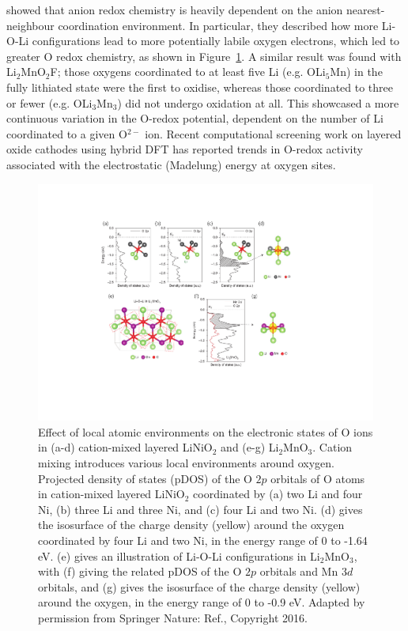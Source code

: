 \documentclass[../main.tex]{subfiles}
\begin{document}
\citeauthor{Seo2016} showed that anion redox chemistry is heavily dependent on the anion nearest-neighbour coordination environment.\cite{Seo2016} In particular, they described how more Li-O-Li configurations lead to more potentially labile oxygen electrons, which led to greater O redox chemistry, as shown in Figure~\ref{fig:o_redox}. A similar result was found with Li$_2$MnO$_2$F; those oxygens coordinated to at least five Li (e.g. OLi$_5$Mn) in the fully lithiated state were the first to oxidise, whereas those coordinated to three or fewer (e.g. OLi$_3$Mn$_3$) did not undergo oxidation at all. This showcased a more continuous variation in the O-redox potential, dependent on the number of Li coordinated to a given O$^{2-}$ ion.\cite{Sharpe2020} Recent computational screening work on layered oxide cathodes using hybrid DFT has reported trends in O-redox activity associated with the electrostatic (Madelung) energy at oxygen sites.\cite{Davies2020}

\begin{figure}
    \centering
    \includegraphics[scale=0.7]{figures/o_redox.pdf}
    \caption{ Effect of local atomic environments on the electronic states of O ions in (a-d) cation-mixed layered LiNiO$_2$ and (e-g) Li$_2$MnO$_3$. Cation mixing introduces various local environments around oxygen. Projected density of states (pDOS) of the O $2p$ orbitals of O atoms in cation-mixed layered LiNiO$_2$ coordinated by (a) two Li and four Ni, (b) three Li and three Ni, and (c) four Li and two Ni. (d) gives the isosurface of the charge density (yellow) around the oxygen coordinated by four Li and two Ni, in the energy range of 0 to -1.64 eV. (e) gives an illustration of Li-O-Li configurations in Li$_2$MnO$_3$, with (f) giving the related pDOS of the O $2p$ orbitals and Mn $3d$ orbitals, and (g) gives the isosurface of the charge density (yellow) around the oxygen, in the energy range of 0 to -0.9 eV. Adapted by permission from Springer Nature: Ref., Copyright 2016.}
    \label{fig:o_redox}
\end{figure}
\end{document}
